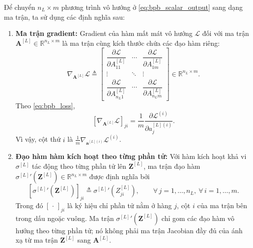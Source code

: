 Để chuyển $n_L \times m$ phương trình vô hướng ở \eqref{eq:bpb_scalar_output} sang dạng ma trận, ta sử dụng các định nghĩa sau:
\begin{enumerate}
    \item \textbf{Ma trận gradient:} Gradient của hàm mất mát vô hướng $\mathcal{L}$ đối với ma trận $\mathbf{A}^{[L]} \in \mathbb{R}^{n_L \times m}$ là ma trận cùng kích thước chứa các đạo hàm riêng:
    \begin{equation}
    \nabla_{\mathbf{A}^{[L]}}\mathcal{L} \triangleq
    \begin{bmatrix}
    \dfrac{\partial\mathcal{L}}{\partial A_{11}^{[L]}} & \cdots & \dfrac{\partial\mathcal{L}}{\partial A_{1m}^{[L]}} \\[8pt]
    \vdots & \ddots & \vdots \\[4pt]
    \dfrac{\partial\mathcal{L}}{\partial A_{n_L 1}^{[L]}} & \cdots & \dfrac{\partial\mathcal{L}}{\partial A_{n_L m}^{[L]}}
    \end{bmatrix} \in \mathbb{R}^{n_L \times m}.
    \end{equation}
    Theo \eqref{eq:bpb_loss},
    \[
    \left[\nabla_{\mathbf{A}^{[L]}}\mathcal{L}\right]_{ji}
    =\frac{1}{m}\frac{\partial\mathcal{L}^{(i)}}{\partial a_j^{[L](i)}}.
    \]
    Vì vậy, cột thứ $i$ là $\frac{1}{m}\nabla_{\mathbf{a}^{[L](i)}}\mathcal{L}^{(i)}$.
 
    \item \textbf{Đạo hàm hàm kích hoạt theo từng phần tử:} Với hàm kích hoạt khả vi $\sigma^{[L]}$ tác động theo từng phần tử lên $\mathbf{Z}^{[L]}$, ma trận đạo hàm ${\sigma^{[L]}}'\!\left(\mathbf{Z}^{[L]}\right) \in \mathbb{R}^{n_L \times m}$ được định nghĩa bởi
    \begin{equation}
    \left[{\sigma^{[L]}}'\!\left(\mathbf{Z}^{[L]}\right)\right]_{ji} \triangleq {\sigma^{[L]}}'\!\left(Z_{ji}^{[L]}\right), \qquad \forall\, j = 1,\dots,n_L,\ \forall\, i = 1,\dots,m.
    \end{equation}
    Trong đó $[\,\cdot\,]_{ji}$ là ký hiệu chỉ phần tử nằm ở hàng $j$, cột $i$ của ma trận bên trong dấu ngoặc vuông. Ma trận ${\sigma^{[L]}}'(\mathbf{Z}^{[L]})$ chỉ gom các đạo hàm vô hướng theo từng phần tử; nó không phải ma trận Jacobian đầy đủ của ánh xạ từ ma trận $\mathbf{Z}^{[L]}$ sang $\mathbf{A}^{[L]}$.
 

\end{enumerate}
